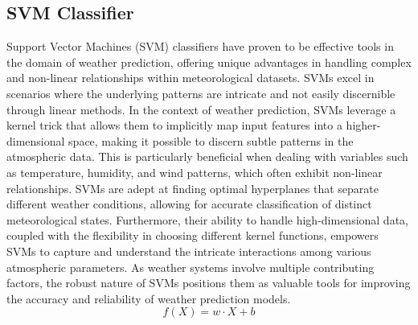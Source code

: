 \documentclass[conference]{IEEEtran}
\begin{document}
\subsection{\textbf{SVM Classifier}}
Support Vector Machines (SVM) classifiers have proven to be effective tools in the domain of weather prediction, offering unique advantages in handling complex and non-linear relationships within meteorological datasets. SVMs excel in scenarios where the underlying patterns are intricate and not easily discernible through linear methods. In the context of weather prediction, SVMs leverage a kernel trick that allows them to implicitly map input features into a higher-dimensional space, making it possible to discern subtle patterns in the atmospheric data. This is particularly beneficial when dealing with variables such as temperature, humidity, and wind patterns, which often exhibit non-linear relationships. SVMs are adept at finding optimal hyperplanes that separate different weather conditions, allowing for accurate classification of distinct meteorological states. Furthermore, their ability to handle high-dimensional data, coupled with the flexibility in choosing different kernel functions, empowers SVMs to capture and understand the intricate interactions among various atmospheric parameters. As weather systems involve multiple contributing factors, the robust nature of SVMs positions them as valuable tools for improving the accuracy and reliability of weather prediction models.
\\ \[ f(X) = w \cdot X + b \]
\end{document}
